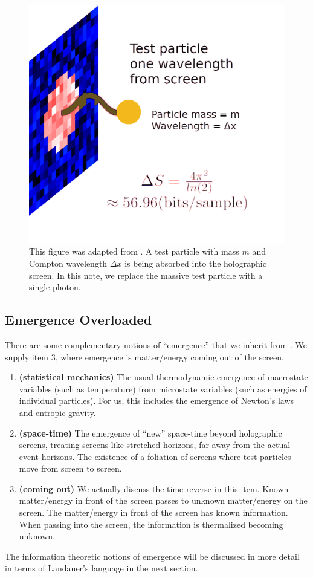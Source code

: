 \documentclass[12pt,a4paper]{article}
\begin{document}
\begin{figure}[h!]
\centering
\includegraphics[scale=0.3]{bits_on_screen.png}
\caption{This figure was adapted from \cite{entropic}.  A test particle with mass $m$ and Compton wavelength $\Delta x$ is being absorbed into the holographic screen.  In this note, we replace the massive test particle with a single photon.}
\label{screen}
\end{figure}


\subsection{Emergence Overloaded}
There are some complementary notions of ``emergence'' that we inherit from \cite{entropic}.  We supply item 3, where emergence is matter/energy coming out of the screen.
\begin{enumerate}
  \item {\bf (statistical mechanics)} The usual thermodynamic emergence of macrostate variables (such as temperature) from microstate variables (such as energies of individual particles).  For us, this includes the emergence of Newton's laws and entropic gravity.
  \item {\bf (space-time)} The emergence of ``new'' space-time beyond holographic screens, treating screens like stretched horizons, far away from the actual event horizons.  The existence of a foliation of screens where test particles move from screen to screen.
  \item {\bf (coming out)} We actually discuss the time-reverse in this item.  Known matter/energy in front of the screen passes to unknown matter/energy on the screen. The matter/energy in front of the screen has known information.  When passing into the screen, the information is thermalized becoming unknown.
\end{enumerate}
The information theoretic notions of emergence will be discussed in more detail in terms of Landauer's language in the next section.
\end{document}
